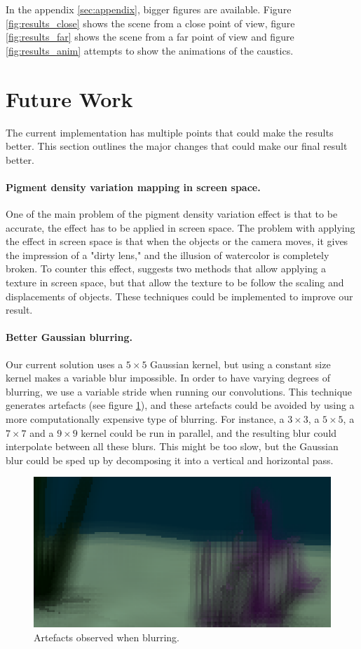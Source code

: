 \documentclass{article}
\begin{document}
In the appendix \ref{sec:appendix}, bigger figures are available. Figure \ref{fig:results_close} shows the scene from a close point of view, figure \ref{fig:results_far} shows the scene from a far point of view and figure \ref{fig:results_anim} attempts to show the animations of the caustics.

\newpage
\section{Future Work}
\label{sec:future_work}
The current implementation has multiple points that could make the results better. This section outlines the major changes that could make our final result better.

\paragraph{Pigment density variation mapping in screen space.} One of the main problem of the pigment density variation effect is that to be accurate, the effect has to be applied in screen space. The problem with applying the effect in screen space is that when the objects or the camera moves, it gives the impression of a "dirty lens," and the illusion of watercolor is completely broken. To counter this effect, \cite{watercolor_paper} suggests two methods that allow applying a texture in screen space, but that allow the texture to be follow the scaling and displacements of objects. These techniques could be implemented to improve our result.

\paragraph{Better Gaussian blurring.} Our current solution uses a $5\times5$ Gaussian kernel, but using a constant size kernel makes a variable blur impossible. In order to have varying degrees of blurring, we use a variable stride when running our convolutions. This technique generates artefacts (see figure \ref{fig:blur_artefacts}), and these artefacts could be avoided by using a more computationally expensive type of blurring. For instance, a $3\times3$, a $5\times5$, a $7\times7$ and a $9\times9$ kernel could be run in parallel, and the resulting blur could interpolate between all these blurs. This might be too slow, but the Gaussian blur could be sped up by decomposing it into a vertical and horizontal pass.

\begin{figure}[h]
	\centering
	\includegraphics[width=0.6\columnwidth]{imgs/blur_artefacts.png}
	\hspace{1em}
	\caption{Artefacts observed when blurring.}
	\label{fig:blur_artefacts}
\end{figure}
\end{document}
